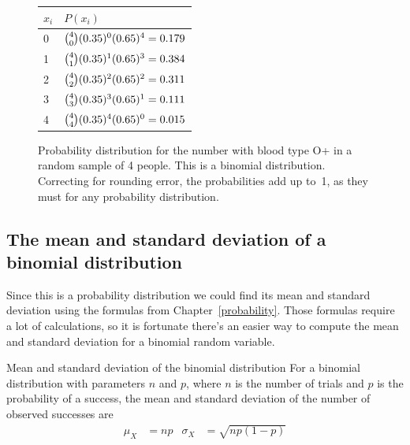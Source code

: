 \begin{figure}[h]
\begin{minipage}[c]{0.37\textwidth}\centering%
\begin{tabular}{l l}
$x_i$ & $P(x_i)$ \\
\hline
0 &  ${4\choose 0}(0.35{})^0(0.65{})^{4} = 0.179$ \vspace{1mm}\\
1 &  ${4\choose 1}(0.35{})^1(0.65{})^{3} = 0.384$  \vspace{1mm}\\
2 & ${4\choose 2}(0.35{})^2(0.65{})^{2} = 0.311$  \vspace{1mm}\\
3 & ${4\choose 3}(0.35{})^3(0.65{})^{1} = 0.111$  \vspace{1mm}\\
4 & ${4\choose 4}(0.35{})^4(0.65{})^{0} = 0.015$  \vspace{1mm}\\
\hline
\end{tabular}
\end{minipage}
\begin{minipage}[c]{0.6\textwidth}\centering%
\end{minipage}
\caption{Probability distribution for the number with blood type O+ in a random sample of 4 people. This is a binomial distribution. Correcting for rounding error, the probabilities add up to~1, as they must for any probability distribution.}
\label{oPositive4}
\label{binomDistrOPositive}
\end{figure}



\subsection{The mean and standard deviation of a binomial distribution}

Since this is a probability distribution we could find its mean and
standard deviation using the formulas from Chapter~\ref{probability}.
Those formulas require a lot of calculations, so it is fortunate there's
an easier way to compute the mean and standard deviation for a binomial
random variable.

\begin{onebox}{Mean and standard deviation of the binomial distribution}
For a binomial distribution with parameters $n$ and $p$, where $n$ is the number of trials and $p$ is the probability of a success, the mean and standard deviation of the number of observed successes are\vspace{-2mm}
\begin{align*}
\mu_{\scriptscriptstyle{X}} &= np
	&\sigma_{\scriptscriptstyle{X}} &= \sqrt{np(1-p)}
\end{align*}
\end{onebox}

